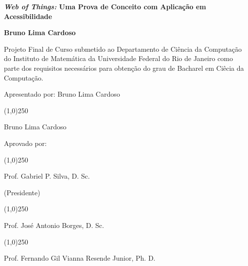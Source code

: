 \begin{titlepage}
\clearpage
\bigskip


\bigskip



\bigskip

\centerline{\textbf{\large \emph{Web of Things:} Uma Prova de Conceito com Aplicação em Acessibilidade}}


\bigskip


\bigskip

\centerline{\textbf{Bruno Lima Cardoso}}



\bigskip


\bigskip

Projeto Final de Curso submetido ao Departamento de Ci\^encia da Computa\c{c}\~ao do Instituto de Matem\'atica da Universidade Federal do Rio de Janeiro como parte dos requisitos necess\'arios para obten\c{c}\~ao do grau de Bacharel em Ciêcia da Computação.


\bigskip

Apresentado por: Bruno Lima Cardoso


\bigskip


\hfill
\line(1,0){250}

\hfill
Bruno Lima Cardoso

\bigskip

\hfil
Aprovado por:

\bigskip

\bigskip

\hfill
\line(1,0){250}

\hfill
Prof. Gabriel P. Silva, D. Sc.

\hfill
(Presidente)

\bigskip

\bigskip

\bigskip

\hfill
\line(1,0){250}

\hfill
Prof. José Antonio Borges, D. Sc.

\bigskip

\bigskip

\bigskip

\hfill
\line(1,0){250} 

\hfill
Prof. Fernando Gil Vianna Resende Junior, Ph. D.

\bigskip

\bigskip

\bigskip

\bigskip


\end{titlepage}
